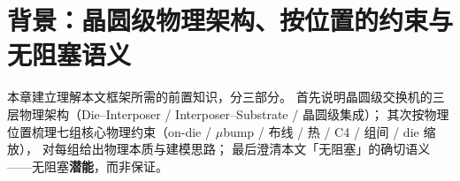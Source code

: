 \chapter{背景：晶圆级物理架构、按位置的约束与无阻塞语义}\label{chap:background}

本章建立理解本文框架所需的前置知识，分三部分。
首先说明晶圆级交换机的三层物理架构（Die--Interposer / Interposer--Substrate / 晶圆级集成）；
其次按物理位置梳理七组核心物理约束（on-die / $\mu$bump / 布线 / 热 / C4 / 组间 / die 缩放），
对每组给出物理本质与建模思路；
最后澄清本文「无阻塞」的确切语义——无阻塞\textbf{潜能}，而非保证。




